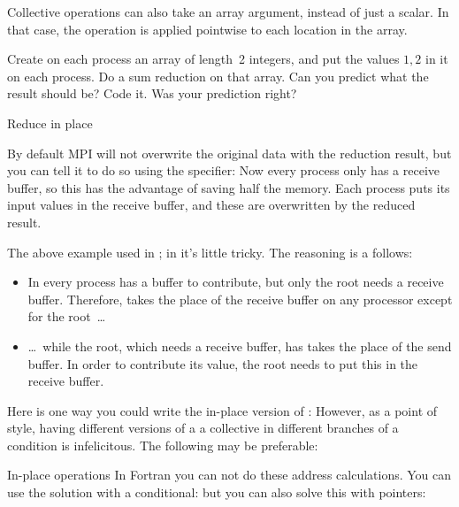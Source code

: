 Collective operations can also take an array argument, instead of just a scalar.
In that case, the operation is applied pointwise to each location in the array.

\begin{exercise}
  \label{ex:randomcoord}
  Create on each process an array of length~2 integers, and put the
  values $1,2$ in it on each process. Do a sum reduction on that
  array. Can you predict what the result should be?  Code it. Was your
  prediction right?
\end{exercise}

 {Reduce in place}
\label{sec:allreduce-inplace}

By default MPI will not overwrite the original data with the reduction
result, but you can tell it to do so
using the  specifier:
%
%
Now every process only has a receive buffer, so this
has the advantage of saving half the memory.
Each process puts its input values in the receive buffer,
and these are overwritten by the reduced result.

The above example used  in
;
in  it's little  tricky.
The reasoning is a follows:
\begin{itemize}
\item In  every process has a buffer to
  contribute, but only the root needs a receive buffer. Therefore,
   takes the place of the receive buffer
  on any processor except for the root~\ldots
\item \dots~while the root, which needs a receive buffer,
  has  takes the place of the send buffer.
  In order to contribute its value, the root needs to put this in the
  receive buffer.
\end{itemize}

Here is one way you could write the in-place version of :
%
%
However, as a point of style, having different versions of a a collective
in different branches of a condition is infelicitous. The following may be preferable:
%

\begin{fortrannote}{In-place operations}
  In Fortran  you can not do these address calculations.
  You can use the solution with a conditional:
  but you can also solve this with pointers:
\end{fortrannote}

